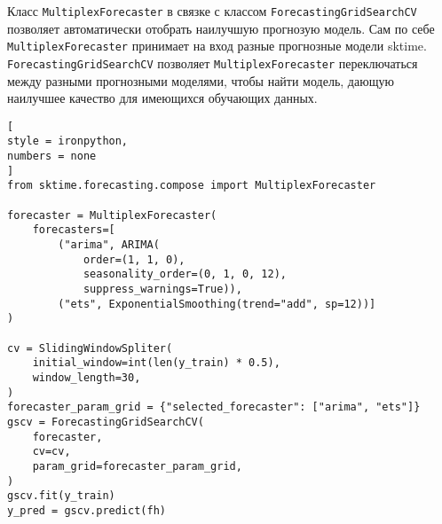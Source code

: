 \documentclass[%
	11pt,
	a4paper,
	utf8,
		]{article}
\begin{document}
Класс \verb|MultiplexForecaster| в связке с классом \verb|ForecastingGridSearchCV| позволяет автоматически отобрать наилучшую прогнозую модель. Сам по себе \verb|MultiplexForecaster| принимает на вход разные прогнозные модели sktime. \verb|ForecastingGridSearchCV| позволяет \verb|MultiplexForecaster| переключаться между разными прогнозными моделями, чтобы найти модель, дающую наилучшее качество для имеющихся обучающих данных.
\begin{lstlisting}[
style = ironpython,
numbers = none
]
from sktime.forecasting.compose import MultiplexForecaster

forecaster = MultiplexForecaster(
    forecasters=[
        ("arima", ARIMA(
            order=(1, 1, 0),
            seasonality_order=(0, 1, 0, 12),
            suppress_warnings=True)),
        ("ets", ExponentialSmoothing(trend="add", sp=12))]
)

cv = SlidingWindowSpliter(
    initial_window=int(len(y_train) * 0.5),
    window_length=30,
)
forecaster_param_grid = {"selected_forecaster": ["arima", "ets"]}
gscv = ForecastingGridSearchCV(
    forecaster,
    cv=cv,
    param_grid=forecaster_param_grid,
)
gscv.fit(y_train)
y_pred = gscv.predict(fh)
\end{lstlisting}









\begin{thebibliography}{99}
	
\end{thebibliography}


\end{document}
